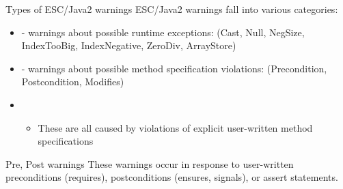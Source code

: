 \documentclass[
pdf,
nocolorBG,
slideColor,
cok,
]{prosper}
\begin{document}
\begin{slide}{Types of ESC/Java2 warnings}
\vspace*{-6ex}
ESC/Java2 warnings fall into various categories:
\begin{itemize}
\item[] - {\gray warnings about possible { runtime exceptions}:
(Cast, Null, NegSize, IndexTooBig, IndexNegative, ZeroDiv, ArrayStore)}

\item[] - warnings about possible method {\knalblue specification violations}:
(Precondition, Postcondition, Modifies)

\item[]
\begin{itemize}
\item These are all caused by violations of explicit user-written method specifications
\end{itemize}

\end{itemize}
\end{slide}
\begin{slide}{Pre, Post warnings}
\vspace*{-6ex}
These warnings occur in response to user-written preconditions (requires), postconditions (ensures, signals), or assert statements.

\begin{figure*}
\tiny

\end{figure*}
\end{slide}%
\end{document}
